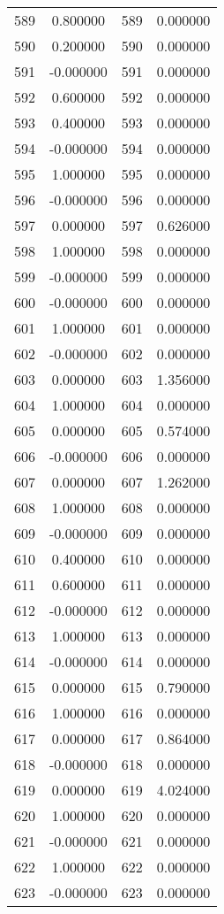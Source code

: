 \documentclass[12pt]{article}
\begin{document}
\begin{longtable}{@{}cccc@{}}
589 & 0.800000 & 589 & 0.000000 \\
590 & 0.200000 & 590 & 0.000000 \\
591 & -0.000000 & 591 & 0.000000 \\
592 & 0.600000 & 592 & 0.000000 \\
593 & 0.400000 & 593 & 0.000000 \\
594 & -0.000000 & 594 & 0.000000 \\
595 & 1.000000 & 595 & 0.000000 \\
596 & -0.000000 & 596 & 0.000000 \\
597 & 0.000000 & 597 & 0.626000 \\
598 & 1.000000 & 598 & 0.000000 \\
599 & -0.000000 & 599 & 0.000000 \\
600 & -0.000000 & 600 & 0.000000 \\
601 & 1.000000 & 601 & 0.000000 \\
602 & -0.000000 & 602 & 0.000000 \\
603 & 0.000000 & 603 & 1.356000 \\
604 & 1.000000 & 604 & 0.000000 \\
605 & 0.000000 & 605 & 0.574000 \\
606 & -0.000000 & 606 & 0.000000 \\
607 & 0.000000 & 607 & 1.262000 \\
608 & 1.000000 & 608 & 0.000000 \\
609 & -0.000000 & 609 & 0.000000 \\
610 & 0.400000 & 610 & 0.000000 \\
611 & 0.600000 & 611 & 0.000000 \\
612 & -0.000000 & 612 & 0.000000 \\
613 & 1.000000 & 613 & 0.000000 \\
614 & -0.000000 & 614 & 0.000000 \\
615 & 0.000000 & 615 & 0.790000 \\
616 & 1.000000 & 616 & 0.000000 \\
617 & 0.000000 & 617 & 0.864000 \\
618 & -0.000000 & 618 & 0.000000 \\
619 & 0.000000 & 619 & 4.024000 \\
620 & 1.000000 & 620 & 0.000000 \\
621 & -0.000000 & 621 & 0.000000 \\
622 & 1.000000 & 622 & 0.000000 \\
623 & -0.000000 & 623 & 0.000000 \\

\end{longtable}
\end{document}
